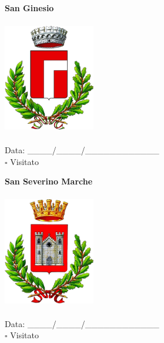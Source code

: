 \documentclass[a5paper,12pt]{article}
\begin{document}
\newpage

\noindent
\begin{minipage}[t]{0.45\textwidth}
    \begin{center}
        \textbf{San Ginesio}
    \end{center}
    \vspace{-0.5cm} %
    \begin{center}
        \includegraphics[height= 5cm, width=4cm]{Marche/Stemma San Ginesio.png}
    \end{center}
    \vspace{-0.4cm} %
    \begin{flushleft}
        Data: \_\_\_\_/\_\_\_\_/\_\_\_\_\_\_\_\_\_\_\_\_ \\
        $\square$ Visitato
    \end{flushleft}
\end{minipage}
\hfill
\noindent
\begin{minipage}[t]{0.45\textwidth}
    \begin{center}
        \textbf{San Severino Marche}
    \end{center}
    \vspace{-0.5cm} %
    \begin{center}
        \includegraphics[height= 5cm, width=4cm]{Marche/Stemma San Severino Marche.png}
    \end{center}
    \vspace{-0.4cm} %
    \begin{flushleft}
        Data: \_\_\_\_/\_\_\_\_/\_\_\_\_\_\_\_\_\_\_\_\_ \\
        $\square$ Visitato
    \end{flushleft}
\end{minipage}
\end{document}

